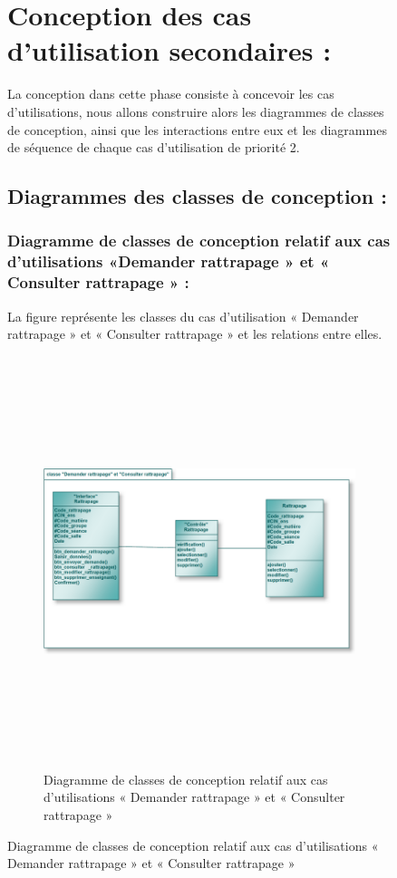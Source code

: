 \documentclass[12 pt]{report}
\begin{document}
\begin{figure}[h]
\begin{center}
\section{Conception des cas d’utilisation secondaires :}
La conception dans cette phase consiste à concevoir les cas d’utilisations, nous allons construire alors les diagrammes de classes de conception, ainsi que les interactions entre eux et les diagrammes de séquence de chaque cas d’utilisation de priorité 2.

\subsection{Diagrammes des classes de conception :}

\subsubsection{Diagramme de classes de conception relatif aux cas d'utilisations      «Demander rattrapage » et « Consulter rattrapage »  :}
La figure  représente les classes du cas d’utilisation « Demander rattrapage » et « Consulter rattrapage » et les relations entre elles.
\begin{figure}[h]
 \begin{center}
\includegraphics[width= 16 cm ,height=  12cm]{cl_dr.PNG}
\caption{Diagramme de classes de conception relatif aux cas d'utilisations « Demander rattrapage » et « Consulter rattrapage » }


\end{center}
\end{figure}
\end{center}
\end{figure}
\end{document}
